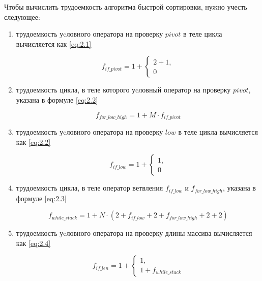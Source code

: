 Чтобы вычислить трудоемкость алгоритма быстрой сортировки, нужно учесть следующее:

\begin{enumerate}[label=---]
		
	\item трудоемкость уcловного оператора на проверку $pivot$ в теле цикла вычисляется как \ref{eq:2.1}
	
	\begin{equation}
	\label{eq:2.1}
	f_{if\_pivot} = 1 + 
	\begin{cases}
	2 + 1, \\
	0
	\end{cases}
	\end{equation}		

	\item трудоемкость цикла, в теле которого уcловный оператор на проверку $pivot$, указана в формуле \ref{eq:2.2}

	\begin{equation}
	\label{eq:2.2}
	f_{for\_low\_high} = 1 + M \cdot f_{if\_pivot}
	\end{equation}

	\item трудоемкость уcловного оператора на проверку $low$ в теле цикла вычисляется как \ref{eq:2.2}

	\begin{equation}
	\label{eq:2.2}
	f_{if\_low
	} = 1 + 
	\begin{cases}
	1, \\
	0
	\end{cases}
	\end{equation}		

	\item трудоемкость цикла, в теле оператор ветвления $f_{if\_low}$ и $f_{for\_low\_high}$, указана в формуле \ref{eq:2.3}

	\begin{equation}
	\label{eq:2.3}
	f_{while\_stack} = 1 + N \cdot (2 + f_{if\_low} + 2 + f_{for\_low\_high}
	+ 2 + 2)
	\end{equation}
	
	\item трудоемкость уcловного оператора на проверку длины массива вычисляется как \ref{eq:2.4}
	
	\begin{equation}
	\label{eq:2.4}
	f_{if\_len} = 1 + 
	\begin{cases}
	1, \\
	1 + f_{while\_stack}
	\end{cases}
	\end{equation}	
		
\end{enumerate}
		
